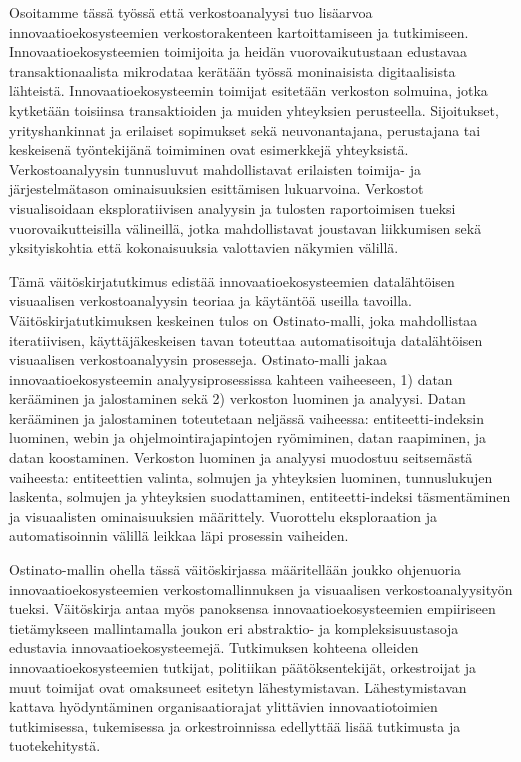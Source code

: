 Osoitamme tässä työssä että verkostoanalyysi tuo lisäarvoa innovaatioekosysteemien verkostorakenteen kartoittamiseen ja tutkimiseen. Innovaatioekosysteemien toimijoita ja heidän vuorovaikutustaan edustavaa transaktionaalista mikrodataa kerätään työssä moninaisista digitaalisista lähteistä. Innovaatioekosysteemin toimijat esitetään verkoston solmuina, jotka kytketään toisiinsa transaktioiden ja muiden yhteyksien perusteella. Sijoitukset, yrityshankinnat ja erilaiset sopimukset sekä neuvonantajana, perustajana tai keskeisenä työntekijänä toimiminen ovat esimerkkejä yhteyksistä. Verkostoanalyysin tunnusluvut mahdollistavat erilaisten toimija- ja järjestelmätason ominaisuuksien esittämisen lukuarvoina. Verkostot visualisoidaan eksploratiivisen analyysin ja tulosten raportoimisen tueksi vuorovaikutteisilla välineillä, jotka mahdollistavat joustavan liikkumisen sekä yksityiskohtia että kokonaisuuksia valottavien näkymien välillä. 

Tämä väitöskirjatutkimus edistää innovaatioekosysteemien datalähtöisen visuaalisen verkostoanalyysin teoriaa ja käytäntöä useilla tavoilla. Väitöskirjatutkimuksen keskeinen tulos on Ostinato-malli, joka mahdollistaa iteratiivisen, käyttäjäkeskeisen tavan toteuttaa automatisoituja datalähtöisen visuaalisen verkostoanalyysin prosesseja. Ostinato-malli jakaa innovaatioekosysteemin analyysiprosessissa kahteen vaiheeseen, 1) datan kerääminen ja jalostaminen sekä 2) verkoston luominen ja analyysi. Datan kerääminen ja jalostaminen toteutetaan neljässä vaiheessa: entiteetti-indeksin luominen, webin ja ohjelmointirajapintojen ryömiminen, datan raapiminen, ja datan koostaminen. Verkoston luominen ja analyysi muodostuu seitsemästä vaiheesta: entiteettien valinta, solmujen ja yhteyksien luominen, tunnuslukujen laskenta, solmujen ja yhteyksien suodattaminen, entiteetti-indeksi täsmentäminen ja visuaalisten ominaisuuksien määrittely. Vuorottelu eksploraation ja automatisoinnin välillä leikkaa läpi prosessin vaiheiden. 

Ostinato-mallin ohella tässä väitöskirjassa määritellään joukko ohjenuoria innovaatioekosysteemien verkostomallinnuksen ja visuaalisen verkostoanalyysityön tueksi. Väitöskirja antaa myös panoksensa innovaatioekosysteemien empiiriseen tietämykseen mallintamalla joukon eri abstraktio- ja kompleksisuustasoja edustavia innovaatioekosysteemejä. Tutkimuksen kohteena olleiden innovaatioekosysteemien tutkijat, politiikan päätöksentekijät, orkestroijat ja muut toimijat ovat omaksuneet esitetyn lähestymistavan. Lähestymistavan kattava hyödyntäminen organisaatiorajat ylittävien innovaatiotoimien tutkimisessa, tukemisessa ja orkestroinnissa edellyttää lisää tutkimusta ja tuotekehitystä.